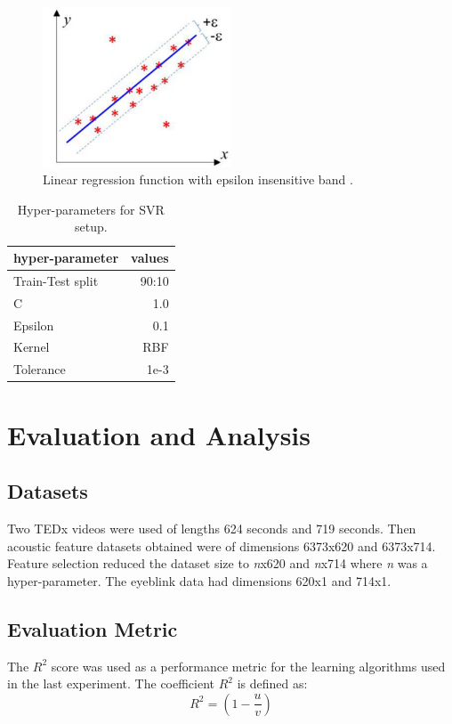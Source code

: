 \begin{figure}
\centering
\includegraphics[width=0.5\textwidth]{sv.png}
\caption{\label{fig:sv}Linear regression function with epsilon insensitive band \cite{svr}.}
\end{figure} 

\begin{table}
\centering
\begin{tabular}{l|r}
hyper-parameter & values \\\hline
Train-Test split & 90:10 \\
C & 1.0 \\
Epsilon & 0.1 \\
Kernel & RBF \\
Tolerance & 1e-3
\end{tabular}
\caption{\label{tab:svr1}Hyper-parameters for SVR setup.}
\end{table}

\section{Evaluation and Analysis}

\subsection{Datasets}
Two TEDx videos were used of lengths 624 seconds and 719 seconds. Then acoustic feature datasets obtained were of dimensions 6373x620 and 6373x714. Feature selection reduced the dataset size to \textit{n}x620 and \textit{n}x714 where \textit{n} was a hyper-parameter. The eyeblink data had dimensions 620x1 and 714x1. 

\subsection{Evaluation Metric}
The $R^2$ score was used as a performance metric for the learning algorithms used in the last experiment. The coefficient $R^2$ is defined as: 
$$R^2 = (1 - \frac{u}{v})$$

